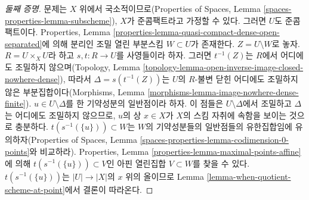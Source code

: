 \begin{proof}[둘째 증명]
문제는 $X$ 위에서 국소적이므로(Properties of Spaces, Lemma
\ref{spaces-properties-lemma-subscheme}), $X$가 준콤팩트라고
가정할 수 있다. 그러면 $U$도 준콤팩트이다.
Properties, Lemma
\ref{properties-lemma-quasi-compact-dense-open-separated}에 의해
분리인 조밀 열린 부분스킴 $W \subset U$가 존재한다.
$Z = U \setminus W$로 놓자.
$R = U \times_X U$라 하고 $s, t : R \to U$를 사영들이라 하자.
그러면 $t^{-1}(Z)$는 $R$에서 어디에도 조밀하지 않으며(Topology,
Lemma \ref{topology-lemma-open-inverse-image-closed-nowhere-dense}),
따라서 $\Delta = s(t^{-1}(Z))$는 $U$의 $R$-불변 닫힌
어디에도 조밀하지 않은 부분집합이다(Morphisms, Lemma
\ref{morphisms-lemma-image-nowhere-dense-finite}).
$u \in U \setminus \Delta$를 한 기약성분의 일반점이라 하자.
이 점들은 $U \setminus \Delta$에서 조밀하고 $\Delta$는 어디에도
조밀하지 않으므로, $u$의 상 $x \in X$가 $X$의 스킴 자취에 속함을
보이는 것으로 충분하다.
$t(s^{-1}(\{u\})) \subset W$는 $W$의 기약성분들의 일반점들의
유한집합임에 유의하자(Properties of Spaces, Lemma
\ref{spaces-properties-lemma-codimension-0-points}와 비교하라).
Properties, Lemma \ref{properties-lemma-maximal-points-affine}에 의해
$t(s^{-1}(\{u\})) \subset V$인 아핀 열린집합 $V \subset W$를
찾을 수 있다. $t(s^{-1}(\{u\}))$는 $|U| \to |X|$의 $x$ 위의
올이므로 Lemma \ref{lemma-when-quotient-scheme-at-point}에서
결론이 따라온다.
\end{proof}

